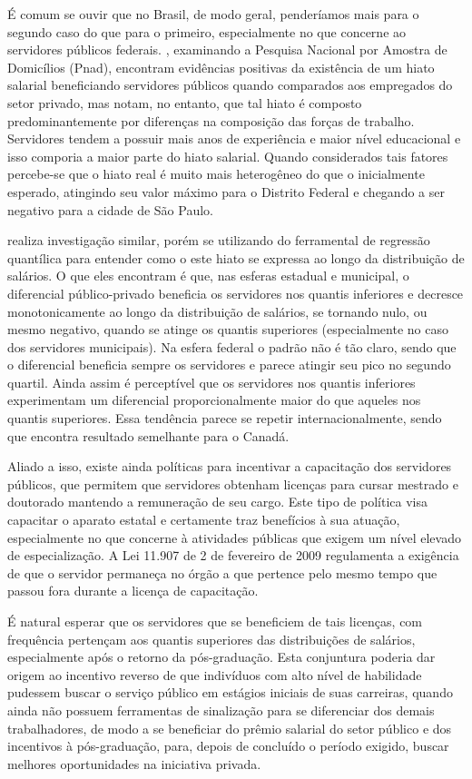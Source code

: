 \documentclass[a4paper]{article}
\begin{document}
É comum se ouvir que no Brasil, de modo geral, penderíamos mais para o segundo caso do que para o primeiro, especialmente no que concerne ao servidores públicos federais. \citet{barros2000}, examinando a Pesquisa Nacional por Amostra de Domicílios (Pnad), encontram evidências positivas da existência de um hiato salarial beneficiando servidores públicos quando comparados aos empregados do setor privado, mas notam, no entanto, que tal hiato é composto predominantemente por diferenças na composição das forças de trabalho. Servidores tendem a possuir mais anos de experiência e maior nível educacional e isso comporia a maior parte do hiato salarial. Quando considerados tais fatores percebe-se que o hiato real é muito mais heterogêneo do que o inicialmente esperado, atingindo seu valor máximo para o Distrito Federal e chegando a ser negativo para a cidade de São Paulo.

\citet{belluzzo2005} realiza investigação similar, porém se utilizando do ferramental de regressão quantílica para entender como o este hiato se expressa ao longo da distribuição de salários. O que eles encontram é que, nas esferas estadual e municipal, o diferencial público-privado beneficia os servidores nos quantis inferiores e decresce monotonicamente ao longo da distribuição de salários, se tornando nulo, ou mesmo negativo, quando se atinge os quantis superiores (especialmente no caso dos servidores municipais). Na esfera federal o padrão não é tão claro, sendo que o diferencial beneficia sempre os servidores e parece atingir seu pico no segundo quartil. Ainda assim é perceptível que os servidores nos quantis inferiores experimentam um diferencial proporcionalmente maior do que aqueles nos quantis superiores. Essa tendência parece se repetir internacionalmente, sendo que \citet{mueller1998} encontra resultado semelhante para o Canadá.

Aliado a isso, existe ainda políticas para incentivar a capacitação dos servidores públicos, que permitem que servidores obtenham licenças para cursar mestrado e doutorado mantendo a remuneração de seu cargo. Este tipo de política visa capacitar o aparato estatal e certamente traz benefícios à sua atuação, especialmente no que concerne à atividades públicas que exigem um nível elevado de especialização. A Lei 11.907 de 2 de fevereiro de 2009 regulamenta a exigência de que o servidor permaneça no órgão a que pertence pelo mesmo tempo que passou fora durante a licença de capacitação.

É natural esperar que os servidores que se beneficiem de tais licenças, com frequência pertençam aos quantis superiores das distribuições de salários, especialmente após o retorno da pós-graduação. Esta conjuntura poderia dar origem ao incentivo reverso de que indivíduos com alto nível de habilidade pudessem buscar o serviço público em estágios iniciais de suas carreiras, quando ainda não possuem ferramentas de sinalização para se diferenciar dos demais trabalhadores, de modo a se beneficiar do prêmio salarial do setor público e dos incentivos à pós-graduação, para, depois de concluído o período exigido, buscar melhores oportunidades na iniciativa privada.
\end{document}
